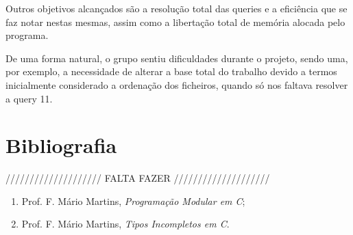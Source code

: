 \documentclass[a4paper]{article}
\begin{document}
Outros objetivos alcançados são a resolução total das queries e a eficiência
que se faz notar nestas mesmas, assim como a libertação total de memória 
alocada pelo programa.

De uma forma natural, o grupo sentiu dificuldades durante o projeto, sendo 
uma, por exemplo, a necessidade de alterar a base total do trabalho devido
a termos inicialmente considerado a ordenação dos ficheiros, quando só nos
faltava resolver a query 11.

\section{Bibliografia}

//////////////////// FALTA FAZER ////////////////////

\begin{enumerate} 
	\item Prof. F. Mário Martins, \textit{Programação Modular em C};
	\item Prof. F. Mário Martins, \textit{Tipos Incompletos em C}.
\end{enumerate}
\end{document}
